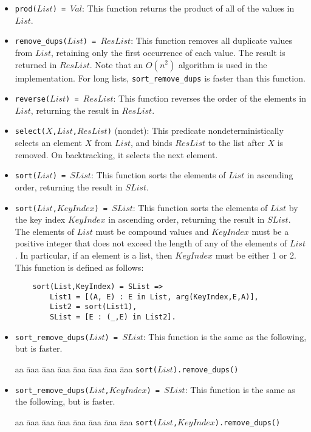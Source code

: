 \begin{itemize}
\item \texttt{prod($List$) = $Val$}: This function returns the product of all of the values in $List$. 
\item \texttt{remove\_dups($List$) = $ResList$}: This function removes all duplicate values from $List$, retaining only the first occurrence of each value.  The result is returned in $ResList$. Note that an $O(n^2)$ algorithm is used in the implementation. For long lists, \texttt{sort\_remove\_dups} is faster than this function.
\item \texttt{reverse($List$) = $ResList$}: This function reverses the order of the elements in $List$, returning the result in $ResList$. 
\item \texttt{select($X$,$List$,$ResList$)} (nondet): This predicate nondeterministically selects an element $X$ from $List$, and binds $ResList$ to the list after $X$ is removed. On backtracking, it selects the next element.
\item \texttt{sort($List$) = $SList$}: This function sorts the elements of $List$ in ascending order, returning the result in $SList$. 
\item \texttt{sort($List$,$KeyIndex$) = $SList$}: This function sorts the elements of $List$ by the key index $KeyIndex$ in ascending order, returning the result in $SList$. The elements of $List$ must be compound values and $KeyIndex$ must be a positive integer that does not exceed the length of any of the elements of $List$. In particular, if an element is a list, then $KeyIndex$ must be either 1 or 2. This function is defined as follows:
\begin{verbatim}
    sort(List,KeyIndex) = SList =>
        List1 = [(A, E) : E in List, arg(KeyIndex,E,A)],
        List2 = sort(List1),
        SList = [E : (_,E) in List2].
\end{verbatim}

\item \texttt{sort\_remove\_dups($List$) = $SList$}: This function is the same as the following, but is faster.
\begin{tabbing}
aa \= aaa \= aaa \= aaa \=aaa \= aaa \= aaa \= aaa \kill
\> \texttt{sort($List$).remove\_dups()}
\end{tabbing}

\item \texttt{sort\_remove\_dups($List$,$KeyIndex$) = $SList$}: This function is the same as the following, but is faster.
\begin{tabbing}
aa \= aaa \= aaa \= aaa \=aaa \= aaa \= aaa \= aaa \kill
\> \texttt{sort($List$,$KeyIndex$).remove\_dups()}
\end{tabbing}


\end{itemize}
